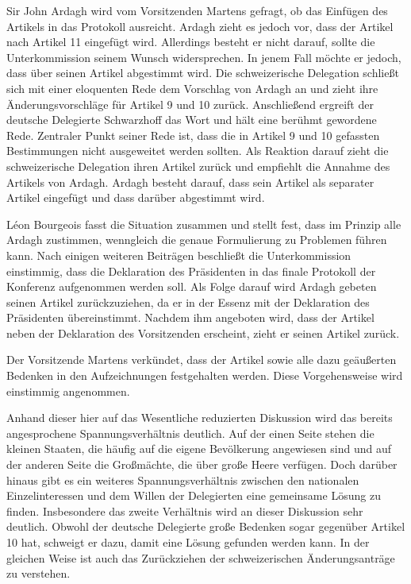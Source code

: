 \documentclass[12pt]{scrartcl}
\begin{document}
Sir John Ardagh wird vom Vorsitzenden Martens gefragt, ob das Einfügen des Artikels in das Protokoll ausreicht. Ardagh zieht es jedoch vor, dass der Artikel nach Artikel 11 eingefügt wird. Allerdings besteht er nicht darauf, sollte die Unterkommission seinem Wunsch widersprechen. In jenem Fall möchte er jedoch, dass über seinen Artikel abgestimmt wird. Die schweizerische Delegation schließt sich mit einer eloquenten Rede dem Vorschlag von Ardagh an und zieht ihre Änderungsvorschläge für Artikel 9 und 10 zurück. Anschließend ergreift der deutsche Delegierte Schwarzhoff das Wort und hält eine berühmt gewordene Rede. Zentraler Punkt seiner Rede ist, dass die in Artikel 9 und 10 gefassten Bestimmungen nicht ausgeweitet werden sollten. Als Reaktion darauf zieht die schweizerische Delegation ihren Artikel zurück und empfiehlt die Annahme des Artikels von Ardagh. Ardagh besteht darauf, dass sein Artikel als separater Artikel eingefügt und dass darüber abgestimmt wird.

Léon Bourgeois fasst die Situation zusammen und stellt fest, dass im Prinzip alle Ardagh zustimmen, wenngleich die genaue Formulierung zu Problemen führen kann. Nach einigen weiteren Beiträgen beschließt die Unterkommission einstimmig, dass die Deklaration des Präsidenten in das finale Protokoll der Konferenz aufgenommen werden soll. Als Folge darauf wird Ardagh gebeten seinen Artikel zurückzuziehen, da er in der Essenz mit der Deklaration des Präsidenten übereinstimmt. Nachdem ihm angeboten wird, dass der Artikel neben der Deklaration des Vorsitzenden erscheint, zieht er seinen Artikel zurück. 

Der Vorsitzende Martens verkündet, dass der Artikel sowie alle dazu geäußerten Bedenken in den Aufzeichnungen festgehalten werden. Diese Vorgehensweise wird einstimmig angenommen.

Anhand dieser hier auf das Wesentliche reduzierten Diskussion wird das bereits angesprochene Spannungsverhältnis deutlich. Auf der einen Seite stehen die kleinen Staaten, die häufig auf die eigene Bevölkerung angewiesen sind und auf der anderen Seite die Großmächte, die über große Heere verfügen. Doch darüber hinaus gibt es ein weiteres Spannungsverhältnis zwischen den nationalen Einzelinteressen und dem Willen der Delegierten eine gemeinsame Lösung zu finden. Insbesondere das zweite Verhältnis wird an dieser Diskussion sehr deutlich. Obwohl der deutsche Delegierte große Bedenken sogar gegenüber Artikel 10 hat, schweigt er dazu, damit eine Lösung gefunden werden kann. In der gleichen Weise ist auch das Zurückziehen der schweizerischen Änderungsanträge zu verstehen.
\end{document}
